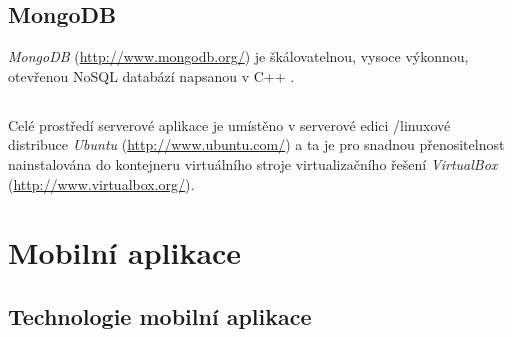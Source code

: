 \subsection{MongoDB}
\emph{MongoDB} (\url{http://www.mongodb.org/}) je škálovatelnou, vysoce výkonnou, otevřenou NoSQL databází napsanou v C++ \cite{Mongo}.

\subsection*{ }
Celé prostředí serverové aplikace je umístěno v serverové edici /linuxové distribuce \emph{Ubuntu} (\url{http://www.ubuntu.com/}) a ta je pro snadnou přenositelnost nainstalována do kontejneru virtuálního stroje virtualizačního řešení \emph{VirtualBox} (\url{http://www.virtualbox.org/}).





\section{Mobilní aplikace}

\subsection{Technologie mobilní aplikace}







